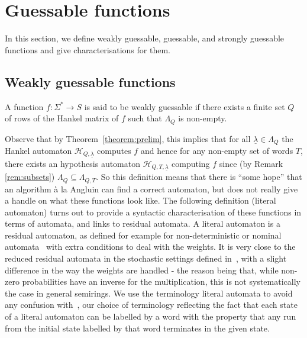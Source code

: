 \documentclass{lmcs}
\numberwithin{theorem}{section}
\begin{document}
\section{Guessable functions}
\label{section:guessable}

In this section, we define weakly guessable,  guessable, and strongly guessable functions and give characterisations for them.

\subsection{Weakly guessable functions}

\begin{defi}
\label{definition:weakly}
A function $f: \Sigma^* \rightarrow S$ is said to be weakly guessable if there exists a finite set $Q$ of rows of the Hankel matrix of $f$ such that $\Lambda_Q$ is non-empty. 
\end{defi}

Observe that by Theorem~\ref{theorem:prelim}, this implies that for all $\underline{\lambda} \in \Lambda_Q$ the Hankel automaton $\mathcal{H}_{Q,\underline{\lambda}}$ computes $f$ and hence for any non-empty set of words $T$, there exists an hypothesis automaton $\mathcal{H}_{Q,T,\underline{\lambda}}$ computing $f$ since (by Remark \ref{rem:subsets}) $\Lambda_Q \subseteq \Lambda_{Q,T}$. So this definition means that there is ``some hope'' that an algorithm \`a la Angluin can find a correct automaton, but does not really give a handle on what these functions look like. The following definition (literal automaton) turns out to provide a syntactic characterisation of these functions in terms of automata, and links to residual automata. A literal automaton is a residual automaton, as defined for example for non-deterministic or nominal automata~\cite{GGV20,MS22} with extra conditions to deal with the weights. It is very close to the reduced residual automata in the stochastic settings defined in~\cite{DE08}, with a slight difference in the way the weights are handled - the reason being that, while non-zero probabilities have an inverse for the multiplication, this is not systematically the case in general semirings. We use the terminology literal automata to avoid any confusion with~\cite{DE08}, our choice of terminology reflecting the fact that each state of a literal automaton can be labelled by a word with the property that any run from the initial state labelled by that word terminates in the given state.
\end{document}
